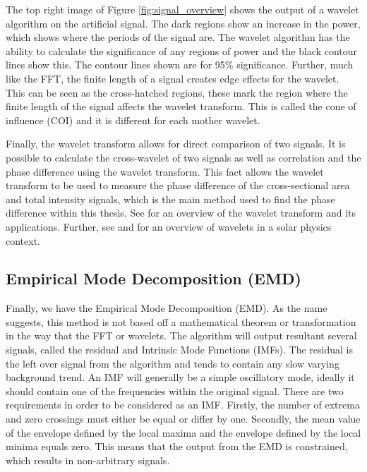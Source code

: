     The top right image of Figure \ref{fig:signal_overview} shows the output of a wavelet algorithm on the artificial signal.
    The dark regions show an increase in the power, which shows where the periods of the signal are.
    The wavelet algorithm has the ability to calculate the significance of any regions of power and the black contour lines show this.
    The contour lines shown are for 95\% significance. 
    Further, much like the FFT, the finite length of a signal creates edge effects for the wavelet.
    This can be seen as the cross-hatched regions, these mark the region where the finite length of the signal affects the wavelet transform.
    This is called the cone of influence (COI) and it is different for each mother wavelet.
    
    Finally, the wavelet transform allows for direct comparison of two signals.
    It is possible to calculate the cross-wavelet of two signals as well as correlation and the phase difference using the wavelet transform.
    This fact allows the wavelet transform to be used to measure the phase difference of the cross-sectional area and total intensity signals, which is the main method used to find the phase difference within this thesis.
    See \cite{torrence} for an overview of the wavelet transform and its applications.
    Further, see \cite{2004SoPh..222..203D} and \cite{WAUO} for an overview of wavelets in a solar physics context.
    
\subsection{Empirical Mode Decomposition (EMD)}

	Finally, we have the Empirical Mode Decomposition (EMD).
	As the name suggests, this method is not based off a mathematical theorem or transformation in the way that the FFT or wavelets.
    The algorithm will output resultant several signals, called the residual and Intrinsic Mode Functions (IMFs).
    The residual is the left over signal from the algorithm and tends to contain any slow varying background trend.
    An IMF will generally be a simple oscillatory mode, ideally it should contain one of the frequencies within the original signal.
    There are two requirements in order to be considered as an IMF.
    Firstly, the number of extrema and zero crossings must either be equal or differ by one.
    Secondly, the mean value of the envelope defined by the local maxima and the envelope defined by the local minima equals zero.
    This means that the output from the EMD is constrained, which results in non-arbitrary signals.
    
